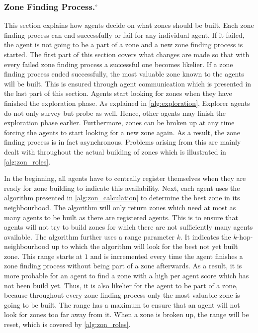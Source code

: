 \subsubsection[Zone Finding Process.]{Zone Finding Process.$^\circ$}\label{alg:zon_finding}
This section explains how agents decide on what zones should be built.
Each zone finding process can end successfully or fail for any individual agent.
If it failed, the agent is not going to be a part of a zone and a new zone finding process is started.
The first part of this section covers what changes are made so that with every failed zone finding process a successful one becomes likelier.
If a zone finding process ended successfully, the most valuable zone known to the agents will be built.
This is ensured through agent communication which is presented in the last part of this section.
Agents start looking for zones when they have finished the exploration phase.
As explained in \autoref{alg:exploration}, Explorer agents do not only survey but probe as well.
Hence, other agents may finish the exploration phase earlier.
Furthermore, zones can be broken up at any time forcing the agents to start looking for a new zone again.
As a result, the zone finding process is in fact asynchronous.
Problems arising from this are mainly dealt with throughout the actual building of zones which is illustrated in \autoref{alg:zon_roles}.

In the beginning, all agents have to centrally register themselves when they are ready for zone building to indicate this availability.
Next, each agent uses the algorithm presented in \autoref{alg:zon_calculation} to determine the best zone in its neighbourhood.
The algorithm will only return zones which need at most as many agents to be built as there are registered agents.
This is to ensure that agents will not try to build zones for which there are not sufficiently many agents available.
The algorithm further uses a range parameter $k$.
It indicates the $k$-hop-neighbourhood up to which the algorithm will look for the best not yet built zone.
This range starts at $1$ and is incremented every time the agent finishes a zone finding process without being part of a zone afterwards.
As a result, it is more probable for an agent to find a zone with a high per agent score which has not been build yet.
Thus, it is also likelier for the agent to be part of a zone, because throughout every zone finding process only the most valuable zone is going to be built.
The range has a maximum to ensure that an agent will not look for zones too far away from it.
When a zone is broken up, the range will be reset, which is covered by \autoref{alg:zon_roles}.

